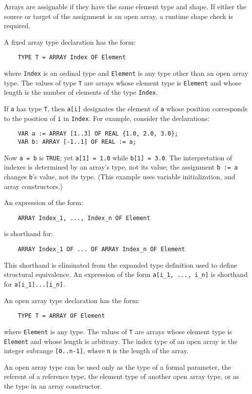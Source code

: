 \documentclass[10pt]{article}
\begin{document}
Arrays are assignable if they have the same element type and shape.  If either
the source or target of the assignment is an open array, a runtime shape check
is required.

A fixed array type declaration has the form:
\begin{verbatim}
    TYPE T = ARRAY Index OF Element
\end{verbatim}
where \verb|Index| is an ordinal type and \verb|Element| is any type other
than an open array type.  The values of type \verb|T| are arrays whose element
type is \verb|Element| and whose length is the number of elements of the type
\verb|Index|.

If \verb|a| has type \verb|T|, then \verb|a[i]| designates the element of
\verb|a| whose position corresponds to the position of \verb|i| in
\verb|Index|.  For example, consider the declarations:
\begin{verbatim}
    VAR a := ARRAY [1..3] OF REAL {1.0, 2.0, 3.0};
    VAR b: ARRAY [-1..1] OF REAL := a;
\end{verbatim}
Now \verb|a = b| is \verb|TRUE|; yet \verb|a[1] = 1.0| while
\verb|b[1] = 3.0|.  The interpretation of indexes is determined by an array's
type, not its value; the assignment \verb|b := a| changes \verb|b|'s value,
not its type.  (This example uses variable initialization, and array
constructors.)

An expression of the form:
\begin{verbatim}
    ARRAY Index_1, ..., Index_n OF Element
\end{verbatim}
is shorthand for:
\begin{verbatim}
    ARRAY Index_1 OF ... OF ARRAY Index_n OF Element
\end{verbatim}
This shorthand is eliminated from the expanded type definition used to define
structural equivalence.  An expression of the form \verb|a[i_1, ..., i_n]| is
shorthand for \verb|a[i_1]...[i_n]|.

An open array type declaration has the form:
\begin{verbatim}
    TYPE T = ARRAY OF Element
\end{verbatim}
where \verb|Element| is any type.  The values of \verb|T| are arrays whose
element type is \verb|Element| and whose length is arbitrary.  The index type
of an open array is the integer subrange \verb|[0..n-1]|, where \verb|n| is
the length of the array.

An open array type can be used only as the type of a formal parameter, the
referent of a reference type, the element type of another open array type, or
as the type in an array constructor.
\end{document}
